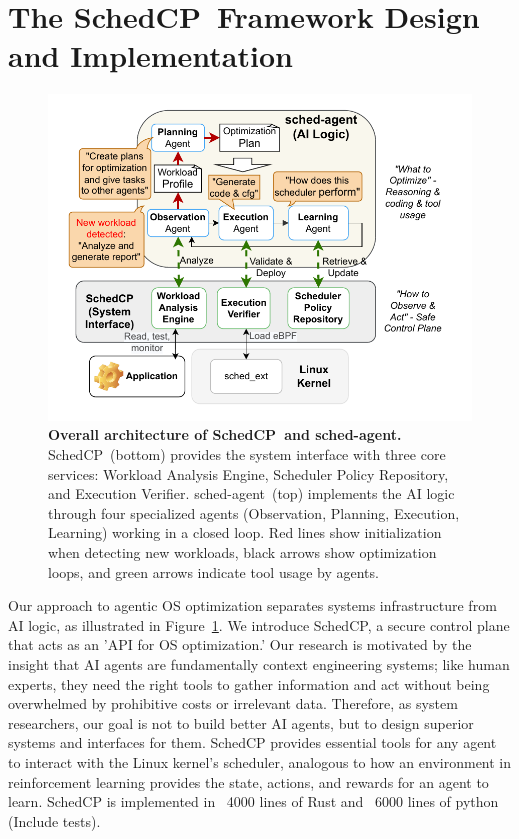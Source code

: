 \documentclass[preprint]{article}
\newcommand{\sys}{SchedCP\xspace}
\newcommand{\agent}{sched-agent\xspace}
\begin{document}
\section{The \sys\ Framework Design and Implementation}
\label{sec:schedcp_framework}

\begin{figure}
    \centering
    \includegraphics[width=\columnwidth]{sections/img/arch-scheddcp.pdf}
    \caption{
        \textbf{Overall architecture of \sys\ and \agent.} 
        \sys\ (bottom) provides the system interface with three core services: Workload Analysis Engine, Scheduler Policy Repository, and Execution Verifier.
        \agent\ (top) implements the AI logic through four specialized agents (Observation, Planning, Execution, Learning) working in a closed loop. Red lines show initialization when detecting new workloads, black arrows show optimization loops, and green arrows indicate tool usage by agents.
    }
    \label{fig:frameworkarch}
\end{figure}

Our approach to agentic OS optimization separates systems infrastructure from AI logic, as illustrated in Figure~\ref{fig:frameworkarch}. We introduce \sys, a secure control plane that acts as an 'API for OS optimization.' Our research is motivated by the insight that AI agents are fundamentally context engineering systems; like human experts, they need the right tools to gather information and act without being overwhelmed by prohibitive costs or irrelevant data. Therefore, as system researchers, our goal is not to build better AI agents, but to design superior systems and interfaces for them. \sys provides essential tools for any agent to interact with the Linux kernel's scheduler, analogous to how an environment in reinforcement learning provides the state, actions, and rewards for an agent to learn. \sys is implemented in ~4000 lines of Rust and ~6000 lines of python (Include tests).
\end{document}
